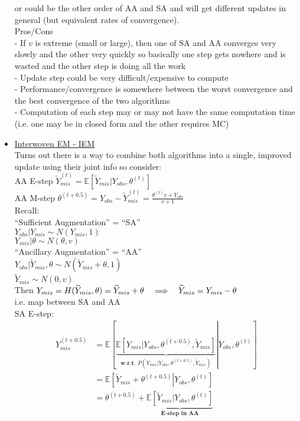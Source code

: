 \documentclass[a4paper, 11pt]{report}
\newcommand{\tab}{\hspace*{1.0em}} %
\newcommand{\imply}{\tab \Longrightarrow \tab}
\newcommand{\yo}{Y_{obs}}
\newcommand{\ym}{Y_{mis}}
\newcommand{\ymf}{Y_{mis}^{(t+0.5)}}
\newcommand{\yt}{\widetilde{Y}_{mis}}
\newcommand{\ytt}{\widetilde{Y}_{mis}^{(t)}}
\newcommand{\tht}{\theta^{(t)}}
\newcommand{\thf}{\theta^{(t+0.5)}}
\begin{document}
\begin{itemize}
		or could be the other order of AA and SA and will get different updates in general (but equivalent rates of convergence). \\ 
		
		Pros/Cons \\
		- If $v$ is extreme (small or large), then one of SA and AA converges very slowly and the other very quickly so basically one step gets nowhere and is wasted and the other step is doing all the work \\
		- Update step could be very difficult/expensive to compute \\
		- Performance/convergence is somewhere between the worst convergence and the best convergence of the two algorithms \\
		- Computation of each step may or may not have the same computation time (i.e. one may be in closed form and the other requires MC) \\
		
	\item \underline{Interwoven EM - IEM} \\
		Turns out there is a way to combine both algorithms into a single, improved update using their joint info so consider: \\
		AA E-step \tab $\ytt = \mathbb{E}\left[\yt \vert \yo,\tht \right]$ \\
		AA M-step \tab $\thf = \yo - \ytt = \frac{\tht v + \yo}{v+1}$ \\ 
		
		Recall: \\
		``Sufficient Augmentation'' = ``SA'' \\
		$\yo \vert \ym \sim N(\ym,1)$ \\
		$\ym \vert \theta \sim N(\theta,v)$ \\
		
		``Ancillary Augmentation'' = ``AA'' \\
		$\yo \vert \yt,\theta \sim N(\yt+\theta,1)$ \\
		$\yt \sim N(0,v)$ \\ 
		
		Then $\ym = H(\yt,\theta) = \yt + \theta \imply \yt = \ym - \theta$ \\
		i.e. map between SA and AA \\ 
		
		SA E-step: 
		\begin{align*}		
			\ymf &= \mathbb{E}\left[ \left. \underbrace{  \mathbb{E}\left[  \ym \vert \yo,\thf,\yt \right]}_{\textbf{w.r.t. } P(\ym \vert \yo,\thf,\yt)}  \right| \yo,\tht \right] \\
				&= \mathbb{E}\left[ \left. \yt + \thf \right| \yo,\tht \right] \\
				&= \thf +  \underbrace{  \mathbb{E}\left[  \yt \vert \yo,\tht \right] }_{\textbf{E-step in AA}}
		\end{align*}		
		

\end{itemize}
\end{document}
